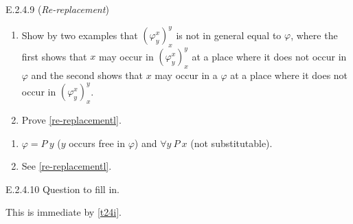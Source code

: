 \setcounter{exercise}{8}

\begin{exercise}{E.2.4.9}
  (\textit{Re-replacement})\begin{enumerate}[label=(\alph*)]
    \item Show by two examples that $(\varphi_y^x)_x^y$ is not in general equal to $\varphi$, where the first shows that $x$ may occur in $(\varphi_y^x)_x^y$ at a place where it does not occur in $\varphi$ and the second shows that $x$ may occur in a $\varphi$ at a place where it does not occur in $(\varphi_y^x)_x^y$.
    \item Prove \ref{re-replacementl}.\qedhere
  \end{enumerate}
\end{exercise}

\begin{enumerate}[label=(\alph*)]
  \item $\varphi=P\ y$ ($y$ occurs free in $\varphi$) and $\forall y\ P\ x$ (not substitutable).
  \item See \ref{re-replacementl}.
\end{enumerate}

\begin{exercise}{E.2.4.10}
  Question to fill in.
\end{exercise}

This is immediate by \ref{t24i}.






